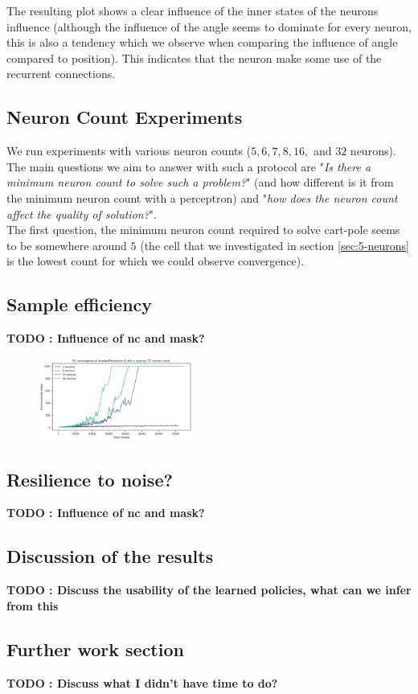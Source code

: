 The resulting plot shows a clear influence of the inner states of the neurons influence (although the influence of the angle seems to dominate for every neuron, this is also a tendency which we observe when comparing the influence of angle compared to position). This indicates that the neuron make some use of the recurrent connections. 


\subsection{Neuron Count Experiments}
We run experiments with various neuron counts ($5,6,7,8,16,$ and $32$ neurons). The main questions we aim to answer with such a protocol are "\textit{Is there a minimum neuron count to solve such a problem?}" (and how different is it from the minimum neuron count with a perceptron) and "\textit{how does the neuron count affect the quality of solution?}". \\

The first question, the minimum neuron count required to solve cart-pole seems to be somewhere around $5$ (the cell that we investigated in section \ref{sec:5-neurons} is the lowest count for which we could observe convergence).


\subsection{Sample efficiency}
\textbf{TODO : Influence of nc and mask?}
\begin{figure}[h!]
    \centering
    \includegraphics[width=0.45\textwidth]{figures/convergence_rate.png}
    \caption{}
\end{figure}

\subsection{Resilience to noise?}
\textbf{TODO : Influence of nc and mask?}

\subsection{Discussion of the results}
\textbf{TODO : Discuss the usability of the learned policies, what can we infer from this}


\subsection{Further work section}
\textbf{TODO : Discuss what I didn't have time to do?}